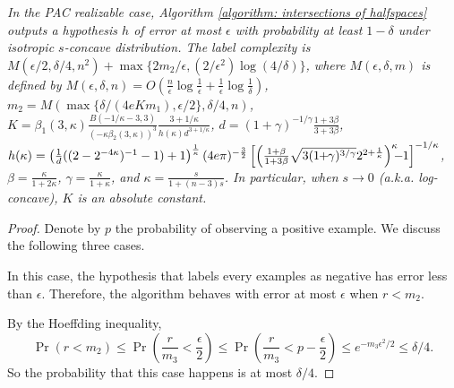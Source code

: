 \documentclass[11pt]{article}
\begin{document}
{{{{
\emph{In the PAC realizable case, Algorithm \ref{algorithm: intersections of halfspaces} outputs a hypothesis $h$ of error at most $\epsilon$ with probability at least $1-\delta$ under isotropic $s$-concave distribution. The label complexity is $M(\epsilon/2,\delta/4,n^2)+\max\{2m_2/\epsilon,(2/\epsilon^2)\log(4/\delta)\}$, where $M(\epsilon,\delta,m)$ is defined by $M(\epsilon,\delta,n)=O\left(\frac{n}{\epsilon}\log \frac{1}{\epsilon}+\frac{1}{\epsilon}\log\frac{1}{\delta}\right)$, $m_2=M(\max\{\delta/(4eKm_1),\epsilon/2\},\delta/4,n)$, $K=\beta_1(3,\kappa)\frac{B(-1/\kappa-3,3)}{(-\kappa\beta_2(3,\kappa))^3}\frac{3+1/\kappa}{h(\kappa)d^{3+1/\kappa}}$, $d=(1+\gamma)^{-1/\gamma}\frac{1+3\beta}{3+3\beta}$, $h(\kappa)=\left(\frac{1}{d}((2-2^{-4\kappa})^{-1}-1)+1\right)^{\frac{1}{\kappa}}(4e\pi)^{-\frac{3}{2}}\left[\left(\frac{1+\beta}{1+3\beta}\sqrt{3(1\hspace{-0.1cm}+\hspace{-0.1cm}\gamma)^{3/\gamma}}2^{2+\frac{1}{\kappa}}\right)^{\kappa}\hspace{-0.2cm}-\hspace{-0.1cm}1\right]^{-1/\kappa}$\hspace{-0.2cm}, $\beta=\frac{\kappa}{1+2\kappa}$, $\gamma=\frac{\kappa}{1+\kappa}$, and $\kappa=\frac{s}{1+(n-3)s}$. In particular, when $s\rightarrow 0$ (a.k.a. log-concave), $K$ is an absolute constant.}

\medskip
\begin{proof}
Denote by $p$ the probability of observing a positive example. We discuss the following three cases.


In this case, the hypothesis that labels every examples as negative has error less than $\epsilon$. Therefore, the algorithm behaves with error at most $\epsilon$ when $r<m_2$.


By the Hoeffding inequality,
\begin{equation*}
\Pr(r<m_2)\le \Pr\left(\frac{r}{m_3}<\frac{\epsilon}{2}\right)\le \Pr\left(\frac{r}{m_3}<p-\frac{\epsilon}{2}\right)\le e^{-m_3\epsilon^2/2}\le\delta/4.
\end{equation*}
So the probability that this case happens is at most $\delta/4$.



\end{proof}}}}}
\end{document}
